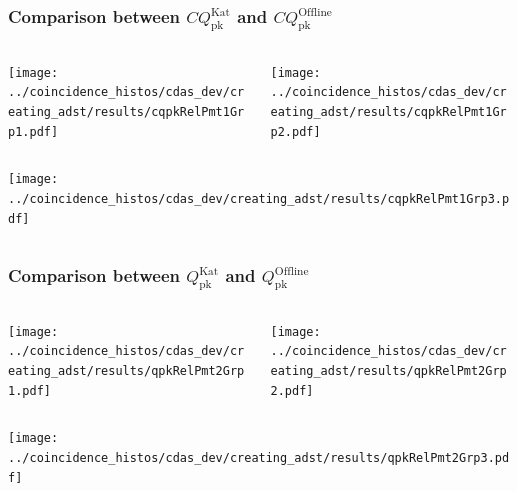 \documentclass[aspectratio=169]{beamer}
\begin{document}
\begin{frame}
  \frametitle{Comparison between
  $CQ^{\mathrm{Kat}}_{\mathrm{pk}}$ and $CQ^{\mathrm{Offline}}_{\mathrm{pk}}$}
  \vspace{0.1cm}
  \begin{columns}
    \centering
    \begin{column}{0.5\textwidth}
      \texttt{[image: ../coincidence\_histos/cdas\_dev/creating\_adst/results/cqpkRelPmt1Grp1.pdf]}
    \end{column}
    \begin{column}{0.5\textwidth}
      \texttt{[image: ../coincidence\_histos/cdas\_dev/creating\_adst/results/cqpkRelPmt1Grp2.pdf]}
    \end{column}
  \end{columns}

  \begin{columns}
    \centering
    \begin{column}{0.5\textwidth}
      \texttt{[image: ../coincidence\_histos/cdas\_dev/creating\_adst/results/cqpkRelPmt1Grp3.pdf]}
    \end{column}
  \end{columns}
\end{frame}

\begin{frame}
  \frametitle{Comparison between $Q^{\mathrm{Kat}}_{\mathrm{pk}}$
  and $Q^{\mathrm{Offline}}_{\mathrm{pk}}$}
  \vspace{0.1cm}
  \begin{columns}
    \centering
    \begin{column}{0.5\textwidth}
      \texttt{[image: ../coincidence\_histos/cdas\_dev/creating\_adst/results/qpkRelPmt2Grp1.pdf]}
    \end{column}
    \begin{column}{0.5\textwidth}
      \texttt{[image: ../coincidence\_histos/cdas\_dev/creating\_adst/results/qpkRelPmt2Grp2.pdf]}
    \end{column}
  \end{columns}

  \begin{columns}
    \centering
    \begin{column}{0.5\textwidth}
      \texttt{[image: ../coincidence\_histos/cdas\_dev/creating\_adst/results/qpkRelPmt2Grp3.pdf]}
    \end{column}
  \end{columns}
\end{frame}
\end{document}
